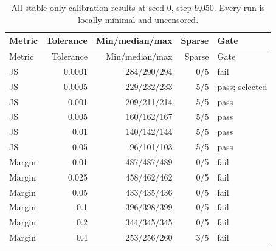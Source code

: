 \begingroup\small\setlength{\tabcolsep}{4pt}
\begin{longtable}{lrrrl}
\caption{All stable-only calibration results at seed 0, step 9,050. Every run is locally minimal and uncensored.}\label{tab:calibration}\\
\toprule
Metric & Tolerance & Min/median/max & Sparse & Gate \\

\midrule\endfirsthead
\toprule
Metric & Tolerance & Min/median/max & Sparse & Gate \\

\midrule\endhead
\bottomrule\endfoot
JS & 0.0001 & 284/290/294 & 0/5 & fail \\
JS & 0.0005 & 229/232/233 & 5/5 & pass; selected \\
JS & 0.001 & 209/211/214 & 5/5 & pass \\
JS & 0.005 & 160/162/167 & 5/5 & pass \\
JS & 0.01 & 140/142/144 & 5/5 & pass \\
JS & 0.05 & 96/101/103 & 5/5 & pass \\
Margin & 0.01 & 487/487/489 & 0/5 & fail \\
Margin & 0.025 & 458/462/462 & 0/5 & fail \\
Margin & 0.05 & 433/435/436 & 0/5 & fail \\
Margin & 0.1 & 396/398/399 & 0/5 & fail \\
Margin & 0.2 & 344/345/345 & 0/5 & fail \\
Margin & 0.4 & 253/256/260 & 3/5 & fail \\
\end{longtable}
\endgroup
